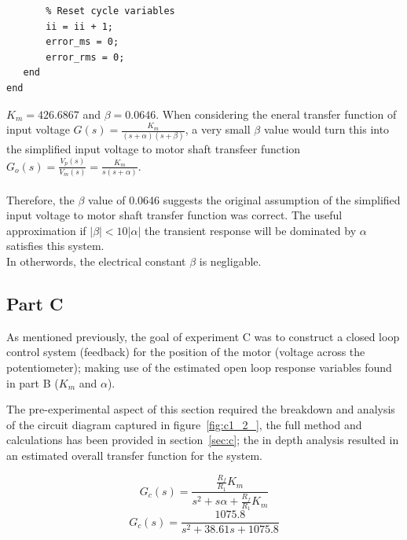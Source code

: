 \documentclass[11pt,a4paper]{article}
\begin{document}
\begin{enumerate}
\begin{lstlisting}
       % Reset cycle variables
       ii = ii + 1;
       error_ms = 0;
       error_rms = 0;
   end
end	
	\end{lstlisting}
	$K_m = 426.6867$ and $\beta = 0.0646$. When considering the eneral transfer function of input voltage $G(s) = \frac{K_m}{(s+\alpha)(s+\beta)}$, a very small $\beta$ value would turn this into the simplified input voltage to motor shaft transfeer function $G_o(s) = \frac{V_p(s)}{V_m(s)} = \frac{K_m}{s(s + \alpha)}$.\\\\
	Therefore, the $\beta$ value of 0.0646 suggests the original assumption of the simplified input voltage to motor shaft transfer function was correct. The useful approximation if $|\beta| < 10|\alpha|$ the transient response will be dominated by $\alpha$ satisfies this system.\\
	In otherwords, the electrical constant $\beta$ is negligable. 



\end{enumerate}








\pagebreak
\subsection{Part C}
As mentioned previously, the goal of experiment C was to construct a closed loop control system (feedback) for the position of the motor (voltage across the potentiometer); making use of the estimated open loop response variables found in part B ($K_m$ and $\alpha$). 

The pre-experimental aspect of this section required the breakdown and analysis of the circuit diagram captured in figure~\ref{fig:c1_2_}, the full method and calculations has been provided in section~\ref{sec:c}; the in depth analysis resulted in an estimated overall transfer function for the system. 

$$ G_c(s) = \frac{\frac{R_f}{R_1}K_m} {s^2 + s\alpha + \frac{R_f}{R_1}K_m} $$
$$ G_c(s) = \frac{1075.8} {s^2 + 38.61s + 1075.8} $$\\

\end{document}
